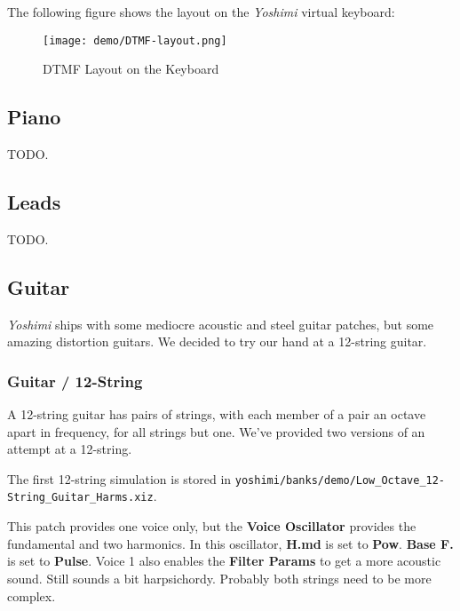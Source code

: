    The following figure shows the layout on the \textsl{Yoshimi} virtual
   keyboard:

\begin{figure}[H]
   \centering 
   \texttt{[image: demo/DTMF-layout.png]}
   \caption{DTMF Layout on the Keyboard}
   \label{fig:cookbook_instruments_DTMF_layout}
\end{figure}

\subsection{Piano}
\label{subsec:cookbook_instruments_piano}

   TODO.

\subsection{Leads}
\label{subsec:cookbook_instruments_leads}

   TODO.

\subsection{Guitar}
\label{subsec:cookbook_instruments_guitar}

   \textsl{Yoshimi} ships with some mediocre acoustic and steel guitar
   patches, but some amazing distortion guitars.  We decided to try our hand
   at a 12-string guitar.

\subsubsection{Guitar / 12-String}
\label{subsubsec:cookbook_instruments_guitar_12_string}

   A 12-string guitar has pairs of strings, with each member of a pair an
   octave apart in frequency, for all strings but one.  We've provided two
   versions of an attempt at a 12-string.

   The first 12-string simulation is stored in
   \texttt{yoshimi/banks/demo/Low\_Octave\_12-String\_Guitar\_Harms.xiz}.

   This patch provides one voice only, but the \textbf{Voice Oscillator}
   provides the fundamental and two harmonics.  In this oscillator,
   \textbf{H.md} is set to \textbf{Pow}.
   \textbf{Base F.} is set to \textbf{Pulse}.
   Voice 1 also enables the \textbf{Filter Params} to get a more acoustic
   sound.  Still sounds a bit harpsichordy.  Probably both strings need to
   be more complex.


